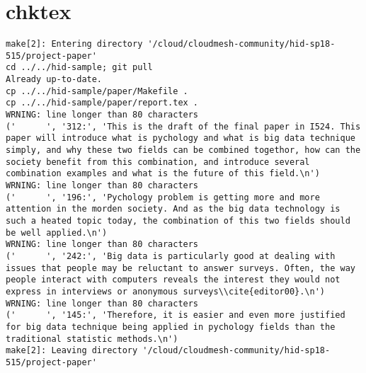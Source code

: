 \appendix
\section{chktex}
\begin{tiny}
\begin{verbatim}
make[2]: Entering directory '/cloud/cloudmesh-community/hid-sp18-515/project-paper'
cd ../../hid-sample; git pull
Already up-to-date.
cp ../../hid-sample/paper/Makefile .
cp ../../hid-sample/paper/report.tex .
WRNING: line longer than 80 characters
('      ', '312:', 'This is the draft of the final paper in I524. This paper will introduce what is pychology and what is big data technique simply, and why these two fields can be combined togethor, how can the society benefit from this combination, and introduce several combination examples and what is the future of this field.\n')
WRNING: line longer than 80 characters
('      ', '196:', 'Pychology problem is getting more and more attention in the morden society. And as the big data technology is such a heated topic today, the combination of this two fields should be well applied.\n')
WRNING: line longer than 80 characters
('      ', '242:', 'Big data is particularly good at dealing with issues that people may be reluctant to answer surveys. Often, the way people interact with computers reveals the interest they would not express in interviews or anonymous surveys\\cite{editor00}.\n')
WRNING: line longer than 80 characters
('      ', '145:', 'Therefore, it is easier and even more justified for big data technique being applied in pychology fields than the traditional statistic methods.\n')
make[2]: Leaving directory '/cloud/cloudmesh-community/hid-sp18-515/project-paper'
\end{verbatim}
\end{tiny}
